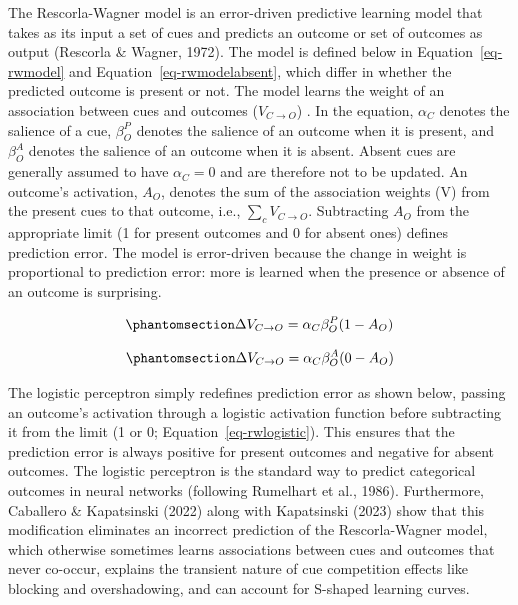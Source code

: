 \documentclass[
  letterpaper,
  DIV=11,
  numbers=noendperiod]{scrartcl}
\begin{document}
The Rescorla-Wagner model is an error-driven predictive learning model
that takes as its input a set of cues and predicts an outcome or set of
outcomes as output (Rescorla \& Wagner, 1972). The model is defined
below in Equation~\ref{eq-rwmodel} and Equation~\ref{eq-rwmodelabsent},
which differ in whether the predicted outcome is present or not. The
model learns the weight of an association between cues and outcomes
(\(V_{C\rightarrow O }\)) . In the equation, \(\alpha_C\) denotes the
salience of a cue, \(\beta^P_O\) denotes the salience of an outcome when
it is present, and \(\beta^A_O\) denotes the salience of an outcome when
it is absent. Absent cues are generally assumed to have \(\alpha_C=0\)
and are therefore not to be updated. An outcome's activation, \(A_O\),
denotes the sum of the association weights (V) from the present cues to
that outcome, i.e., \(\sum_cV_{C\rightarrow O}\). Subtracting \(A_O\)
from the appropriate limit (1 for present outcomes and 0 for absent
ones) defines prediction error. The model is error-driven because the
change in weight is proportional to prediction error: more is learned
when the presence or absence of an outcome is surprising.

\begin{equation}\phantomsection\label{eq-rwmodel}{
\Delta V_{C\rightarrow O } = \alpha_C\beta^P_O(1-A_O)
}\end{equation}

\begin{equation}\phantomsection\label{eq-rwmodelabsent}{
\Delta V_{C\rightarrow O } = \alpha_C\beta^A_O(0-A_O)
}\end{equation}

The logistic perceptron simply redefines prediction error as shown
below, passing an outcome's activation through a logistic activation
function before subtracting it from the limit (1 or 0;
Equation~\ref{eq-rwlogistic}). This ensures that the prediction error is
always positive for present outcomes and negative for absent outcomes.
The logistic perceptron is the standard way to predict categorical
outcomes in neural networks (following Rumelhart et al., 1986).
Furthermore, Caballero \& Kapatsinski (2022) along with Kapatsinski
(2023) show that this modification eliminates an incorrect prediction of
the Rescorla-Wagner model, which otherwise sometimes learns associations
between cues and outcomes that never co-occur, explains the transient
nature of cue competition effects like blocking and overshadowing, and
can account for S-shaped learning curves.
\end{document}
